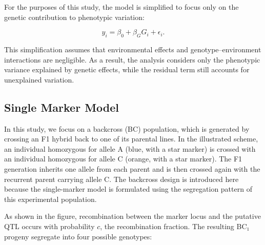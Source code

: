 \documentclass[
  letterpaper,
  DIV=11,
  numbers=noendperiod]{scrartcl}
\begin{document}
For the purposes of this study, the model is simplified to focus only on
the genetic contribution to phenotypic variation:

\[
y_i = \beta_0 + \beta_G G_i + \epsilon_i.
\]

This simplification assumes that environmental effects and
genotype--environment interactions are negligible. As a result, the
analysis considers only the phenotypic variance explained by genetic
effects, while the residual term still accounts for unexplained
variation.

\subsection{Single Marker Model}\label{single-marker-model}

In this study, we focus on a backcross (BC) population, which is
generated by crossing an F1 hybrid back to one of its parental lines. In
the illustrated scheme, an individual homozygous for allele A (blue,
with a star marker) is crossed with an individual homozygous for allele
C (orange, with a star marker). The F1 generation inherits one allele
from each parent and is then crossed again with the recurrent parent
carrying allele C. The backcross design is introduced here because the
single-marker model is formulated using the segregation pattern of this
experimental population.

\begin{figure}


\caption{\label{fig-1}}

\end{figure}%

As shown in the figure, recombination between the marker locus and the
putative QTL occurs with probability \(c\), the recombination fraction.
The resulting BC₁ progeny segregate into four possible genotypes:
\end{document}
